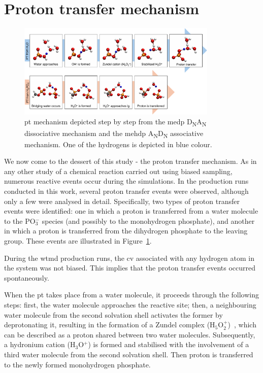 
\section{Proton transfer mechanism}

\begin{figure}[b!]
    \centering
    \includegraphics[width=0.85\textwidth]{Figures/4_Results/results_proton_transfer.pdf}
    \caption{\Acf{pt} mechanism depicted step by step from the \ac{medp} D\textsubscript{N}A\textsubscript{N} dissociative mechanism and the \ac{mehdp} A\textsubscript{N}D\textsubscript{N} associative mechanism. One of the hydrogens is depicted in blue colour.}
    \label{fig:medp_proton_transfer}
\end{figure}

We now come to the dessert of this study - the proton transfer mechanism. As in any other study of a chemical reaction carried out using biased sampling, numerous reactive events occur during the simulations. In the production runs conducted in this work, several proton transfer events were observed, although only a few were analysed in detail. Specifically, two types of proton transfer events were identified: one in which a proton is transferred from a water molecule to the PO$_3^-$ species (and possibly to the monohydrogen phosphate), and another in which a proton is transferred from the dihydrogen phosphate to the leaving group. These events are illustrated in Figure~\ref{fig:medp_proton_transfer}.

During the \ac{wtmd} production runs, the \ac{cv} associated with any hydrogen atom in the system was not biased. This implies that the proton transfer events occurred spontaneously.

When the \ac{pt} takes place from a water molecule, it proceeds through the following steps: first, the water molecule approaches the reactive site; then, a neighbouring water molecule from the second solvation shell activates the former by deprotonating it, resulting in the formation of a Zundel complex (H$_5$O$_2^+$)~\citep{xantheasDancesHydrogenCations2009, zundelEnergiebanderTunnelndenUberschussProtonen1968}, which can be described as a proton shared between two water molecules. Subsequently, a hydronium cation (H$_3$O$^+$) is formed and stabilised with the involvement of a third water molecule from the second solvation shell. Then proton is transferred to the newly formed monohydrogen phosphate.

